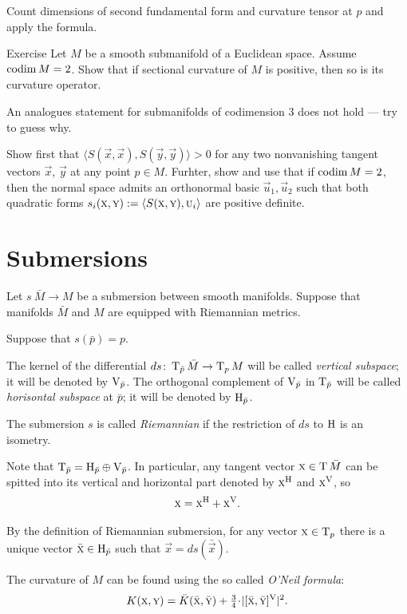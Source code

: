  Count dimensions of second fundamental form and curvature tensor at $p$ and apply the formula.

\begin{thm}{Exercise}\label{ex:codim=2}
Let $M$ be a smooth submanifold of a Euclidean space.
Assume $\operatorname{\rm codim}\nolimits M=2$.
Show that if sectional curvature of $M$ is positive, then so is its curvature operator.

An analogues statement for submanifolds of codimension 3 does not hold --- try to guess why.
\end{thm}

Show first that 
$\langle S(\vec x,\vec x),S(\vec y,\vec y)\rangle> 0$
for any two nonvanishing tangent vectors $\vec x$, $\vec y$ at any point $p\in M$. 
Furhter, show and use that if $\operatorname{\rm codim}\nolimits M=2$, then the normal space admits an orthonormal basic $\vec u_1,\vec u_2$ such that both quadratic forms
$s_i(\textsc x,\textsc y)\mathrel{:=}\langle S(\textsc x,\textsc y),\textsc u_i\rangle$
are positive definite. 


\section{Submersions}

Let $s\:\bar M\to M$ be a submersion between smooth manifolds.
Suppose that manifolds $\bar M$ and $M$ are equipped with Riemannian metrics.

Suppose that $s(\bar p)=p$.

The kernel of the differential $ds\colon\operatorname{\rm T}_{\bar p} \bar M\to \operatorname{\rm T}_p M$ will be called \emph{vertical subspace};
it will be denoted by ${\operatorname{\rm V}}_{\bar p}$.
The orthogonal complement of ${\operatorname{\rm V}}_{\bar p}$ in $\operatorname{\rm T}_{\bar p}$ will be called \emph{horisontal subspace} at ${\bar p}$;
it will be denoted by ${\operatorname{\rm H}}_{\bar p}$.

The submersion $s$ is called \emph{Riemannian} if the restriction of $ds$ to ${\operatorname{\rm H}}$ is an isometry.

Note that $\operatorname{\rm T}_{\bar p}={\operatorname{\rm H}}_{\bar p}\oplus {\operatorname{\rm V}}_{\bar p}$.
In particular, any tangent vector $\vec x\z\in\T\bar M$ can be spitted into its vertical and horizontal part denoted by $\textsc x^{\operatorname{\rm H}}$ and $\textsc x^{\operatorname{\rm V}}$, so 
\[\textsc x=\textsc x^{{\operatorname{\rm H}}}+\textsc x^{\operatorname{\rm V}}.\]

By the definition of Riemannian submersion,
for any vector $\textsc x\in\operatorname{\rm T}_p$ there is a unique vector $\bar{\textsc x}\in{\operatorname{\rm H}}_{\bar p}$ such that 
$\vec x=ds(\bar{\vec x})$.

The curvature of $ M$ can be found using the so called \emph{O'Neil formula}:
\[K(\vec x,\vec y)=\bar K(\bar{\vec x},\bar{\vec y})+\tfrac34\cdot|[\bar{\vec x},\bar{\vec y}]^\V|^2.\]

